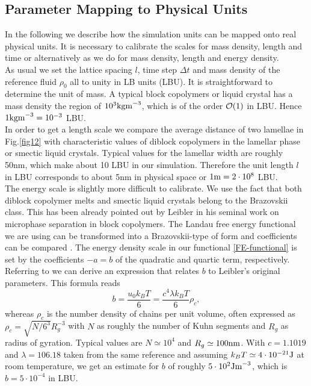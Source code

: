 \documentclass[8.5pt,twoside,twocolumn]{article}
\newcommand{\e}[1]{\cdot10^{#1}}
\begin{document}
\subsection*{Parameter Mapping to Physical Units}

In the following we describe how the simulation units can be mapped onto real physical units.
It is necessary to calibrate the scales for mass density, length and time or alternatively as we do for mass density, length and energy density.\\
As usual we set the lattice spacing $l$, time step $\Delta t$ and mass density of the reference fluid $\rho_0$ all to unity in LB units (LBU).
It is straightforward to determine the unit of mass. 
A typical block copolymers or liquid crystal has a mass density the region of $10^3 {\rm kg m}^{-3}$, which is of the order ${\cal O}(1)$ in LBU.
Hence $1 {\rm kg m}^{-3}=10^{-3}$ LBU.\\
In order to get a length scale we compare the average distance of two lamellae in Fig.\ref{fig12} with characteristic values of diblock copolymers in the lamellar phase or smectic liquid crystals.
Typical values for the lamellar width are roughly 50nm, which make about 10 LBU in our simulation.
Therefore the unit length $l$ in LBU corresponds to about 5nm in physical space or $1 {\rm m}=2\cdot10^8$ LBU.\\
The energy scale is slightly more difficult to calibrate.
We use the fact that both diblock copolymer melts and smectic liquid crystals belong to the Brazovskii class.
This has been already pointed out by Leibler \cite{Leibler80} in his seminal work on microphase separation in block copolymers.
The Landau free energy functional we are using can be transformed into a Brazovskii-type of form and coefficients can be compared \cite{Xu05, Fredrickson89}.
The energy density scale in our functional \ref{FE-functional} is set by the coefficients $-a=b$ of the quadratic and quartic term, respectively.
Referring to \cite{Fredrickson89} we can derive an expression that relates $b$ to Leibler's original parameters.
This formula reads 
\begin{equation}
b=\frac{u_0 k_B T}{6}=\frac{c^4\lambda k_B T}{6} \rho_c,
\end{equation}
whereas $\rho_c$ is the number density of chains per unit volume,
often expressed as $\rho_c=\sqrt{N/6^3} R_g^{-3}$ with $N$ as roughly the number of Kuhn segments and $R_g$ as radius of gyration.
Typical values are $N\simeq10^4$ and $R_g\simeq 100{\rm nm}$.
With $c=1.1019$ and $\lambda=106.18$ taken from the same reference and assuming $k_B T\simeq 4\e{-21} {\rm J}$ at room temperature, we get an estimate for $b$ of roughly $5\e{2} {\rm J m}^{-3}$, which is $b=5\e{-4}$ in LBU.
\end{document}
